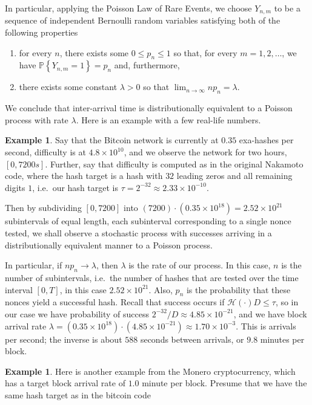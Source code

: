 \documentclass[12pt,english]{mrl}
\theoremstyle{definition}
\newtheorem{Ex}[lem]{Example}
\renewcommand{\leq}{\leqslant}
\numberwithin{equation}{section}
\numberwithin{figure}{section}
\numberwithin{equation}{section}
\numberwithin{equation}{section}
\numberwithin{figure}{section}
\begin{document}
In particular, applying the Poisson Law of Rare Events, we choose $Y_{n,m}$ to be a sequence of independent Bernoulli random variables satisfying both of the following properties
\begin{enumerate}
\item for every $n$, there exists some $0 \leq p_n \leq 1$ so that, for every $m = 1, 2, \ldots$, we have $\mathbb{P}\left\{Y_{n,m} = 1\right\} = p_n$ and, furthermore,
\item there exists some constant $\lambda > 0$ so that $\lim_{n \to \infty} n p_n = \lambda$.
\end{enumerate}
We conclude that inter-arrival time is distributionally equivalent to a Poisson process with rate $\lambda$. Here is an example with a few real-life numbers.

\begin{Ex}
Say that the Bitcoin network is currently at $0.35$ exa-hashes per second, difficulty is at $4.8\times 10^{10}$, and we observe the network for two hours, $[0,7200 s]$. Further, say that difficulty is computed as in the original Nakamoto code, where the hash target is a hash with $32$ leading zeros and all remaining digits $1$, i.e.\ our hash target is $\tau = 2^{-32} \approx 2.33 \times 10^{-10}$.

Then by subdividing $[0, 7200]$ into $\left(7200\right) \cdot \left(0.35\times 10^{18}\right) = 2.52 \times 10^21$ subintervals of equal length, each subinterval corresponding to a single nonce tested, we shall observe a stochastic process with successes arriving in a distributionally equivalent manner to a Poisson process.

In particular, if $n p_n \to \lambda$, then $\lambda$ is the rate of our process. In this case, $n$ is the number of subintervals, i.e.\ the number of hashes that are tested over the time interval $[0,T]$, in this case $2.52 \times 10^{21}$. Also, $p_n$ is the probability that these nonces yield a successful hash. Recall that success occurs if $\mathcal{H}(\cdot) D \leq \tau$, so in our case we have probability of success $2^{-32}/D \approx 4.85 \times 10^{-21}$, and we have block arrival rate $\lambda = (0.35\times 10^{18})\cdot (4.85\times 10^{-21}) \approx 1.70 \times 10^{-3}$. This is arrivals per second; the inverse is about $588$ seconds between arrivals, or $9.8$ minutes per block.
\end{Ex}

\begin{Ex}
Here is another example from the Monero cryptocurrency, which has a target block arrival rate of $1.0$ minute per block. Presume that we have the same hash target as in the bitcoin code
\end{Ex}
\end{document}
